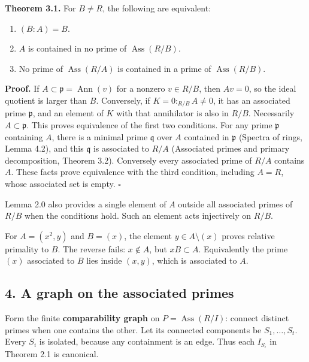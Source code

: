 \documentclass[
]{article}
\providecommand{\tightlist}{%
  \setlength{\itemsep}{0pt}\setlength{\parskip}{0pt}}
\begin{document}
\textbf{Theorem 3.1.} For \(B\ne R\), the following are equivalent:

\begin{enumerate}
\def\labelenumi{\arabic{enumi}.}
\tightlist
\item
  \((B:A)=B\).
\item
  \(A\) is contained in no prime of \(\operatorname{Ass}(R/B)\).
\item
  No prime of \(\operatorname{Ass}(R/A)\) is contained in a prime of
  \(\operatorname{Ass}(R/B)\).
\end{enumerate}

\textbf{Proof.} If \(A\subset\mathfrak p=\operatorname{Ann}(v)\) for a
nonzero \(v\in R/B\), then \(Av=0\), so the ideal quotient is larger
than \(B\). Conversely, if \(K=0:_{R/B}A\ne0\), it has an associated
prime \(\mathfrak p\), and an element of \(K\) with that annihilator is
also in \(R/B\). Necessarily \(A\subset\mathfrak p\). This proves
equivalence of the first two conditions. For any prime \(\mathfrak p\)
containing \(A\), there is a minimal prime \(\mathfrak q\) over \(A\)
contained in \(\mathfrak p\) (Spectra of rings, Lemma 4.2), and this
\(\mathfrak q\) is associated to \(R/A\) (Associated primes and primary
decomposition, Theorem 3.2). Conversely every associated prime of
\(R/A\) contains \(A\). These facts prove equivalence with the third
condition, including \(A=R\), whose associated set is empty. \(\square\)

Lemma 2.0 also provides a single element of \(A\) outside all associated
primes of \(R/B\) when the conditions hold. Such an element acts
injectively on \(R/B\).

For \(A=(x^2,y)\) and \(B=(x)\), the element \(y\in A\setminus(x)\)
proves relative primality to \(B\). The reverse fails: \(x\notin A\),
but \(xB\subset A\). Equivalently the prime \((x)\) associated to \(B\)
lies inside \((x,y)\), which is associated to \(A\).

\subsection{4. A graph on the associated
primes}\label{a-graph-on-the-associated-primes}

Form the finite \textbf{comparability graph} on
\(P=\operatorname{Ass}(R/I)\): connect distinct primes when one contains
the other. Let its connected components be \(S_1,\ldots,S_t\). Every
\(S_i\) is isolated, because any containment is an edge. Thus each
\(I_{S_i}\) in Theorem 2.1 is canonical.
\end{document}
